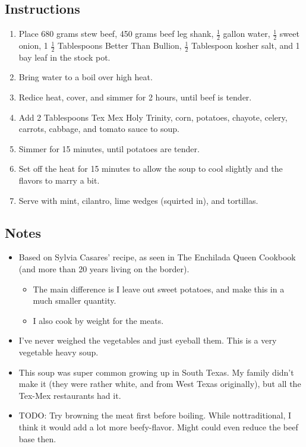 \begin{multicols}{2}
\subsection*{Instructions}
\begin{enumerate}
    \item Place 680 grams stew beef, 450 grams beef leg shank, \( \frac{1}{2} \) gallon water, \( \frac{1}{2} \) sweet onion, 1 \( \frac{1}{2} \) Tablespoons Better Than Bullion, \( \frac{1}{2} \) Tablespoon kosher salt, and 1 bay leaf in the stock pot.
    \item Bring water to a boil over high heat.
    \item Redice heat, cover, and simmer for 2 hours, until beef is tender.
    \item Add 2 Tablespoons Tex Mex Holy Trinity, corn, potatoes, chayote, celery, carrots, cabbage, and tomato sauce to soup.
    \item Simmer for 15 minutes, until potatoes are tender.
    \item Set off the heat for 15 minutes to allow the soup to cool slightly and the flavors to marry a bit.
    \item Serve with mint, cilantro, lime wedges (squirted in), and tortillas.
\end{enumerate}

\subsection*{Notes}
\begin{itemize}
    \item Based on Sylvia Casares' recipe, as seen in The Enchilada Queen Cookbook (and more than 20 years living on the border).
    \begin{itemize}
        \item The main difference is I leave out sweet potatoes, and make this in a much smaller quantity.
        \item I also cook by weight for the meats.
    \end{itemize}
    \item I've never weighed the vegetables and just eyeball them. This is a very vegetable heavy soup.
    \item This soup was super common growing up in South Texas. My family didn't make it (they were rather white, and from West Texas originally), but all the Tex-Mex restaurants had it.
    \item TODO: Try browning the meat first before boiling. While nottraditional, I think it would add a lot more beefy-flavor. Might could even reduce the beef base then.
\end{itemize}
\end{multicols}
\clearpage